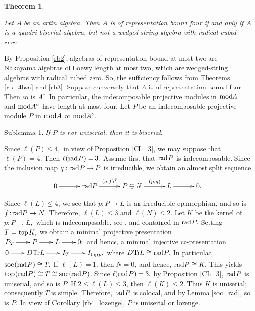 \documentclass[10pt]{amsart}
\newtheorem{Theo}{Theorem}[subsection]
\theoremstyle{definition}
\newcommand{\mmod}{{\rm mod}}
\newcommand{\rad}{{\rm rad}\hspace{.5pt}}
\newcommand{\soc}{{\rm soc}\hspace{.5pt}}
\newcommand{\ntop}{{\rm top}\hspace{.5pt}}
\newcommand{\vp}{\vspace{.5pt}}
\begin{document}
\begin{Theo}\label{main_rb4}

Let $A$ be an artin algebra. Then $A$ is of representation bound four if and only if $A$ is a quadri-biserial algebra, but not a wedged-string algebra with radical cubed zero.

\end{Theo}

 By Proposition \ref{rb2}, algebras of representation bound at most two are 
Nakayama algebras of Loewy length at most two, which are wedged-string algebras with radical cubed zero. So, the sufficiency follows from Theorems \ref{rb_4bsa} and \ref{rb3}. Suppose conversely that $A$ is of representation bound four. Then so is $A^\circ$. In particular, the indecomposable projective modules in $\mmod A$ and $\mmod A^\circ$ have length at most four. %
Let $P$ be an indecomposable projective module $P$ in $\mmod A$ or $\mmod A^\circ.$ 

\vp

{\sc Sublemma 1.} {\it If $P$ is not uniserial, then it is biserial.}

Since $\ell(P)\le 4,$ in view of Proposition \ref{CL_3}, we may suppose that $\ell(P)=4$. Then $\ell(\rad P)=3.$ Assume first that $\rad P$ is indecomposable.  
Since the inclusion map $q: \rad P\to P$ is irreducible, we obtain an almost split sequence \vspace{-6pt}
$$\xymatrixcolsep{30pt}\xymatrix{0 \ar[r] & \rad P \ar[r]^-{(q, f)^T} & P \oplus N \ar[r]^-{(p, g)} & L \ar[r] & 0.}\vspace{-4.5pt}$$ 

Since $\ell(L)\le 4$, we see that $p: P\to L$ is an irreducible epimorphism, and so is $f\!: \! \rad P\to N$. Therefore, $\ell(L)\le 3$ and $\ell(N)\le 2$. Let $K$ be the kernel of $p: P\to L,$ which is indecomposable, see \cite[(V.5.6)]{ARS}, and
contained in $\rad P.$ Setting $T=\ntop K,$ we obtain a minimal projective presentation $\xymatrixcolsep{20pt}\xymatrix{\hspace{-2pt}P_{\hspace{.5pt}T} \ar[r] & P \ar[r] & L \ar[r] & 0;\hspace{-2pt}}\vspace{-3pt}$ and hence, a minimal injective co-presentation
$\xymatrixcolsep{20pt}\xymatrix{\hspace{-2pt}0 \ar[r] & D{\rm Tr}L \ar[r] & I_T \ar[r] & I_{\ntop p},}\hspace{-2pt}\vspace{-0.5pt}$ where $D{\rm Tr}L\cong \rad P.$ In particular, $\soc(\rad P) \cong T.$ If $\ell(L)=1$, then $N=0,$ and hence, $\rad P \cong K.$ This yields $\ntop(\rad P)\cong T\cong \soc(\rad P)$. Since $\ell(\rad P)=3,$ by Proposition \ref{CL_3}, $\rad P$ is uniserial, and so is $P$. If $2\le \ell(L)\le 3$, then $\ell(K)\le 2.$ Thus $K$ is uniserial; consequently $T$ is simple. Therefore, $\rad P$ is colocal, and by Lemma \ref{soc_rad}, so is $P.$ In view of Corollary \ref{rb4_lozenge}, $P$ is uniserial or lozenge. 
\end{document}
